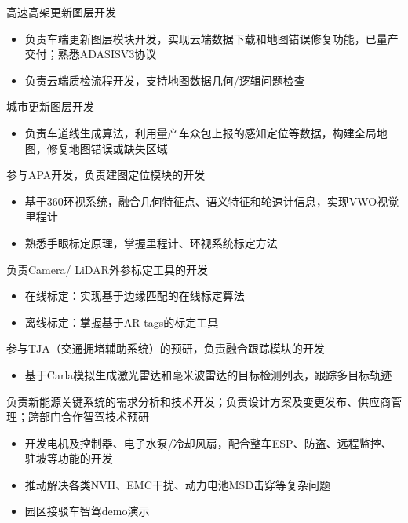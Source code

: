 \documentclass{resume}
\begin{document}
\begin{onehalfspacing}
  高速高架更新图层开发
  \begin{itemize}
    \item {负责车端更新图层模块开发，实现云端数据下载和地图错误修复功能，已量产交付；熟悉ADASISV3协议}
    \item 负责云端质检流程开发，支持地图数据几何/逻辑问题检查
  \end{itemize}

  城市更新图层开发
  \begin{itemize}
    \item 负责车道线生成算法，利用量产车众包上报的感知定位等数据，构建全局地图，修复地图错误或缺失区域
  \end{itemize}
\end{onehalfspacing}

\begin{onehalfspacing}
  参与APA开发，负责建图定位模块的开发
  \begin{itemize}
    \item 基于360环视系统，融合几何特征点、语义特征和轮速计信息，实现VWO视觉里程计
    \item 熟悉手眼标定原理，掌握里程计、环视系统标定方法
  \end{itemize}

  负责Camera/ LiDAR外参标定工具的开发
  \begin{itemize}
    \item 在线标定：实现基于边缘匹配的在线标定算法
    \item 离线标定：掌握基于AR tags的标定工具
  \end{itemize}

  参与TJA（交通拥堵辅助系统）的预研，负责融合跟踪模块的开发
  \begin{itemize}
    \item 基于Carla模拟生成激光雷达和毫米波雷达的目标检测列表，跟踪多目标轨迹
  \end{itemize}
\end{onehalfspacing}

负责新能源关键系统的需求分析和技术开发；负责设计方案及变更发布、供应商管理；跨部门合作智驾技术预研

\begin{onehalfspacing}
  \begin{itemize}
    \item 开发电机及控制器、电子水泵/冷却风扇，配合整车ESP、防盗、远程监控、驻坡等功能的开发
    \item 推动解决各类NVH、EMC干扰、动力电池MSD击穿等复杂问题
    \item 园区接驳车智驾demo演示
  \end{itemize}
\end{onehalfspacing}
\end{document}
